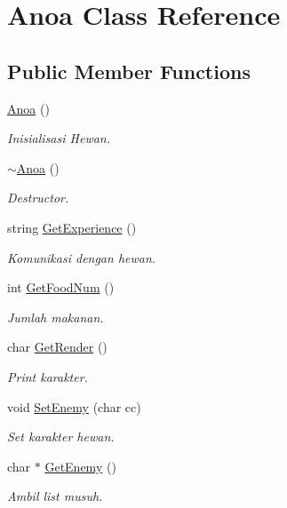 \hypertarget{class_anoa}{}\section{Anoa Class Reference}
\label{class_anoa}
\subsection*{Public Member Functions}
\begin{DoxyCompactItemize}
\item 
\hyperlink{class_anoa_adc03b4c166e61ef3c66c84bb9f74d037}{Anoa} ()\hypertarget{class_anoa_adc03b4c166e61ef3c66c84bb9f74d037}{}\label{class_anoa_adc03b4c166e61ef3c66c84bb9f74d037}

\begin{DoxyCompactList}\small\item\em Inisialisasi Hewan. \end{DoxyCompactList}\item 
\hyperlink{class_anoa_ab80d0e5f30d7b6a008e56f4fad144ecf}{$\sim$\+Anoa} ()\hypertarget{class_anoa_ab80d0e5f30d7b6a008e56f4fad144ecf}{}\label{class_anoa_ab80d0e5f30d7b6a008e56f4fad144ecf}

\begin{DoxyCompactList}\small\item\em Destructor. \end{DoxyCompactList}\item 
string \hyperlink{class_anoa_a5873ad7fbbaabe159fe78d18abca5cf9}{Get\+Experience} ()\hypertarget{class_anoa_a5873ad7fbbaabe159fe78d18abca5cf9}{}\label{class_anoa_a5873ad7fbbaabe159fe78d18abca5cf9}

\begin{DoxyCompactList}\small\item\em Komunikasi dengan hewan. \end{DoxyCompactList}\item 
int \hyperlink{class_anoa_a1bd6ef587f919996a80664ce7fe378f4}{Get\+Food\+Num} ()
\begin{DoxyCompactList}\small\item\em Jumlah makanan. \end{DoxyCompactList}\item 
char \hyperlink{class_anoa_aa18da9e26b96be2ab14510cab0753653}{Get\+Render} ()
\begin{DoxyCompactList}\small\item\em Print karakter. \end{DoxyCompactList}\item 
void \hyperlink{class_anoa_a3e2a743b367371207a4f511542016c9f}{Set\+Enemy} (char cc)
\begin{DoxyCompactList}\small\item\em Set karakter hewan. \end{DoxyCompactList}\item 
char $\ast$ \hyperlink{class_anoa_aebfc13ce0edf718e7ad691ce227444dc}{Get\+Enemy} ()
\begin{DoxyCompactList}\small\item\em Ambil list musuh. \end{DoxyCompactList}\end{DoxyCompactItemize}

